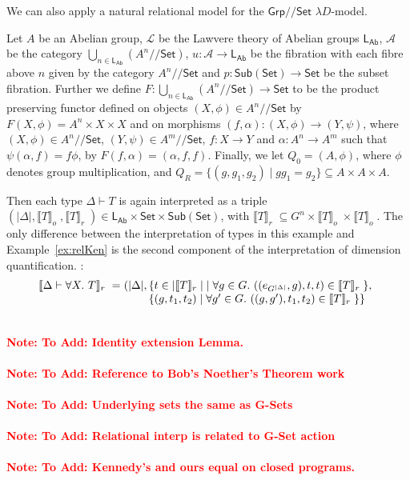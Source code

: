 \documentclass[a4paper,UKenglish]{lipics}
\newcommand\note[1]{{ \bf \textcolor{red} {\vspace{2mm}\; \\ Note: #1\\}}}
\newcommand{\msf}[1]{\mathsf{#1}} %
\newcommand{\Grp}{\msf{Grp}}
\newcommand{\Set}{\msf{Set}}
\newcommand{\Sub}[1]{\msf{Sub}(#1)}
\newcommand{\LAb}{\msf{L}_{\msf{Ab}}}
\newcommand{\A}{\mathcal{A}}
\newcommand{\GroupSet}[1]{#1/\!/\Set}
\newcommand{\GrpSet}{\GroupSet{\Grp}}
\newcommand{\semo}[1]{\ensuremath{\llbracket #1 \rrbracket _o} \;}
\newcommand{\semr}[1]{\ensuremath{\llbracket #1 \rrbracket _r} \;}
\begin{document}
We can also apply a natural relational model for the $\GrpSet$ $\lambda D$-model.
\begin{example}\label{ex:relMon}
Let $A$ be an Abelian group, $\mathcal{L}$ be the Lawvere theory of Abelian groups $\LAb$, $\A$ be the category $\bigcup_{n\in \LAb} (\GroupSet{A^{n}})$, $u: \A \rightarrow \LAb$ be the fibration with each fibre above $n$ given by the category $\GroupSet{A^{n}}$ and $p:\Sub{\Set} \rightarrow \Set$ be the subset fibration. Further we define $F:\bigcup_{n\in \LAb} (\GroupSet{A^{n}}) \rightarrow \Set$ to be the product preserving functor defined on objects $(X,\phi) \in \GroupSet{A^{n}}$ by $F(X, \phi) = A^{n} \times X \times X$ and on morphisms $(f, \alpha) : (X,\phi) \rightarrow (Y, \psi)$, where $(X,\phi) \in \GroupSet{A^{n}}$, $(Y,\psi) \in \GroupSet{A^{m}}$, $f: X \rightarrow Y$ and $\alpha : A^n \rightarrow A^m$ such that $\psi (\alpha, f) = f \phi$, by $F(f,\alpha) = (\alpha, f, f)$. Finally, we let $Q_0 = (A,\phi)$, where $\phi$ denotes group multiplication, and $Q_R = \{(g,g_1,g_2) \mathrel| gg_1 = g_2 \} \subseteq A \times A \times A$.

Then each type $\Delta \vdash T$ is again interpreted as a triple $(|\Delta|, \semo{T}, \semr{T}) \in \LAb \times \Set \times \Sub{\Set}$, with $\semr{T} \subseteq G^n \times \semo{T} \times \semo{T}$. The only difference between the interpretation of types in this example and Example~\ref{ex:relKen} is the second component of the interpretation of dimension quantification.
:
\begin{displaymath}
  \begin{array}{l@{\hspace{0.3em}}c@{\hspace{0.3em}}l}
    \semr{\Delta \vdash \forall X.~T} & = & (|\Delta|,
    \begin{array}[t]{@{}l}
      \{ t \in |\semr{T}| \mathrel| \forall g \in G.~((e_{G^{|\Delta|}},g), t, t) \in \semr{T} \},\\
      \{ (g, t_1, t_2) \mathrel| \forall g' \in G.~((g,g'), t_1, t_2) \in \semr{T} \} \}
    \end{array}
  \end{array}
\end{displaymath}
\end{example}

\note{To Add: Identity extension Lemma.}
\note{To Add: Reference to Bob's Noether's Theorem work}
\note{To Add: Underlying sets the same as G-Sets}
\note{To Add: Relational interp is related to G-Set action}
\note{To Add: Kennedy's and ours equal on closed programs.}
\end{document}
